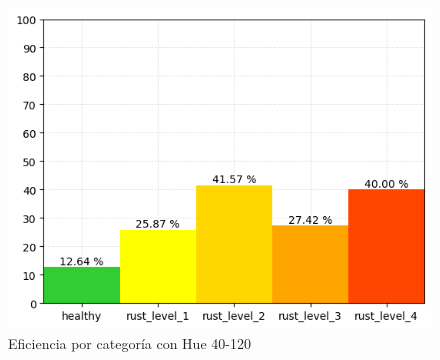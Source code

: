 \begin{figure}
\centering
\includegraphics[scale=0.6]{images/result_classes_40_120.png}
\caption{Eficiencia por categoría con Hue 40-120}
\label{img:efficiency_categories_40_120}
\end{figure}
